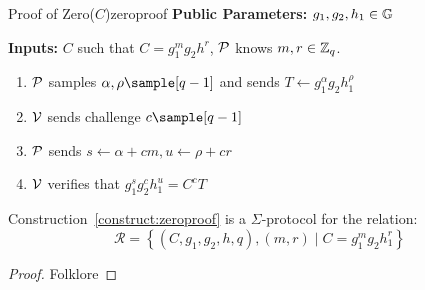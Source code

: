 \begin{construction}{Proof of Zero($C$)}{zeroproof}
    \vspace{1em}
    \textbf{Public Parameters:} $g_1, g_2, h_1\in \mathbb{G}$

    \textbf{Inputs:} $C$ such that $C = g_1^{m}g_2h^{r}$, $\mathcal{P}$ knows $m, r \in \mathbb{Z}_q$.
    \vspace{1em}
        \begin{enumerate}
        \item $\mathcal{P}$ samples $\alpha, \rho \sample [q-1]$ and sends $T \gets g_1^{\alpha}g_2h_1^{\rho}$ 

        \item $\mathcal{V}$ sends challenge $c \sample [q-1]$

        \item $\mathcal{P}$ sends $s \gets \alpha + cm, u \gets \rho + cr$

        \item $\mathcal{V}$ verifies that $g_1^sg_2^ch_1^u = C^cT$
    \end{enumerate}
\end{construction}
    

\begin{theorem}
    Construction~\ref{construct:zeroproof} is a $\Sigma$-protocol for the relation: 
    \[
    \mathcal{R} = \left\{ (C, g_1,g_2,h, q),(m,r) \; | \; C = g_1^{m}g_2h_1^{r}  \right\}
    \]    
\end{theorem}

\begin{proof}
    Folklore
\end{proof}

